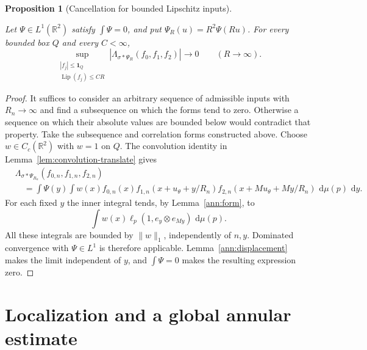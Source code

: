 \documentclass[11pt]{amsart}
\newcommand{\R}{\mathbb R}
\newcommand{\dd}{\,\mathrm d}
\newcommand{\one}{\mathbf 1}
\newtheorem{proposition}[theorem]{Proposition}
\theoremstyle{definition}
\theoremstyle{remark}
\numberwithin{equation}{section}
\providecommand{\lean}[1]{}
\providecommand{\leanok}{}
\begin{document}
\begin{proposition}[Cancellation for bounded Lipschitz inputs]
\label{ann:local}
\lean{Auto.ann_local}
\leanok
Let $\Psi\in L^1(\R^2)$ satisfy $\int\Psi=0$, and put
$\Psi_R(u)=R^2\Psi(Ru)$. For every bounded box $Q$ and every
$C<\infty$,
\[
 \sup_{\substack{|f_j|\le\one_Q\\
                  \operatorname{Lip}(f_j)\le CR}}
 |\Lambda_{\sigma*\Psi_R}(f_0,f_1,f_2)|\longrightarrow0
 \qquad (R\to\infty).
\]
\end{proposition}
\begin{proof}
It suffices to consider an arbitrary sequence of admissible
inputs with $R_n\to\infty$ and find a subsequence on which the
forms tend to zero. Otherwise a sequence on which their absolute
values are bounded below would contradict that property.
Take the subsequence and correlation forms constructed above.
Choose $w\in C_c(\R^2)$ with $w=1$ on $Q$. The convolution
identity in Lemma~\ref{lem:convolution-translate} gives
\begin{align*}
 &\Lambda_{\sigma*\Psi_{R_n}}(f_{0,n},f_{1,n},f_{2,n})\\
 &\quad=\int\Psi(y)\int
 w(x)f_{0,n}(x)
 f_{1,n}(x+u_\theta+y/R_n)
 f_{2,n}(x+Mu_\theta+My/R_n)\,\dd\mu(p)\,\dd y.
\end{align*}
For each fixed $y$ the inner integral tends, by
Lemma~\ref{ann:form}, to
\[
 \int w(x)\ell_p(1,e_y\otimes e_{My})\,\dd\mu(p).
\]
All these integrals are bounded by $\|w\|_1$, independently of
$n,y$. Dominated convergence with $\Psi\in L^1$ is therefore
applicable. Lemma~\ref{ann:displacement} makes the limit independent
of $y$, and $\int\Psi=0$ makes the resulting expression zero.
\end{proof}

\section{Localization and a global annular estimate}
\end{document}
